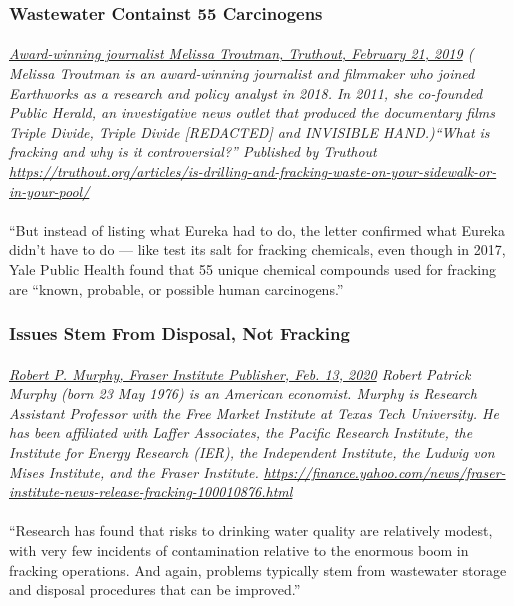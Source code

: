 \documentclass{article}
\begin{document}
\subsubsection{Wastewater Containst 55 Carcinogens}
\paragraph{}
\small
\textit{
\underline{Award-winning journalist Melissa Troutman, Truthout, February 21, 2019}
( Melissa Troutman is an award-winning journalist and filmmaker who joined Earthworks as a research and policy analyst in 2018. In 2011, she co-founded Public Herald, an investigative news outlet that produced the documentary films Triple Divide, Triple Divide [REDACTED] and INVISIBLE HAND.)``What is fracking and why is it controversial?'' Published by Truthout
\url{https://truthout.org/articles/is-drilling-and-fracking-waste-on-your-sidewalk-or-in-your-pool/}}
\normalsize
\paragraph{}
``But instead of listing what Eureka had to do, the letter confirmed what Eureka didn’t have to do — like test its salt for fracking chemicals, even though in 2017, Yale Public Health found that 55 unique chemical compounds used for fracking are “known, probable, or possible human carcinogens.”

\subsubsection{Issues Stem From Disposal, Not Fracking}
\paragraph{}
\small
\textit{
\underline{Robert P. Murphy, Fraser Institute Publisher, Feb. 13, 2020}
Robert Patrick Murphy (born 23 May 1976) is an American economist. Murphy is Research Assistant Professor with the Free Market Institute at Texas Tech University. He has been affiliated with Laffer Associates, the Pacific Research Institute, the Institute for Energy Research (IER), the Independent Institute, the Ludwig von Mises Institute, and the Fraser Institute. 
\url{https://finance.yahoo.com/news/fraser-institute-news-release-fracking-100010876.html}}

\normalsize
\paragraph{}
``Research has found that risks to drinking water quality are relatively modest, with very few incidents of contamination relative to the enormous boom in fracking operations. And again, problems typically stem from wastewater storage and disposal procedures that can be improved.”
\end{document}
